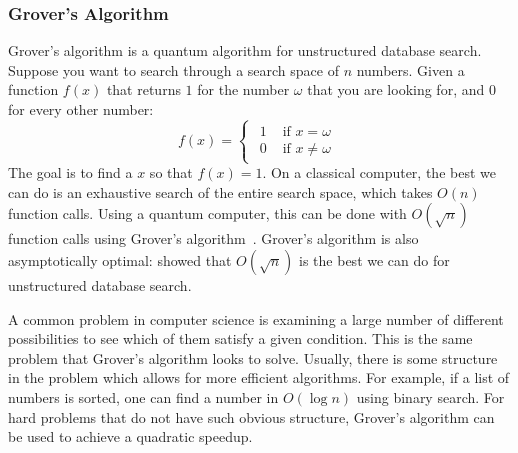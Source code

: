 \subsubsection{Grover's Algorithm}
Grover's algorithm is a quantum algorithm for unstructured database search.
Suppose you want to search through a search space of $n$ numbers.
Given a function $f(x)$ that returns $1$ for the number $\omega$ that you are looking for, and $0$ for every other number:
\begin{equation} \label{eqn:black-box-fn}
f(x) =
\begin{cases}
\begin{aligned}
1 & \text{ if } x = \omega \\
0 & \text{ if } x \neq \omega
\end{aligned}
\end{cases}
\end{equation}
The goal is to find a $x$ so that $f(x) = 1$.
On a classical computer, the best we can do is an exhaustive search of the entire search space, which takes $O(n)$ function calls.
Using a quantum computer, this can be done with $O(\sqrt{n})$ function calls using Grover's algorithm~\cite{grover1996fast}.
Grover's algorithm is also asymptotically optimal: \textcite{zalka1999grover} showed that $O(\sqrt{n})$ is the best we can do for unstructured database search.

A common problem in computer science is examining a large number of different possibilities to see which of them satisfy a given condition.
This is the same problem that Grover's algorithm looks to solve.
Usually, there is some structure in the problem which allows for more efficient algorithms.
For example, if a list of numbers is sorted, one can find a number in $O(\log n)$ using binary search.
For hard problems that do not have such obvious structure, Grover's algorithm can be used to achieve a quadratic speedup.

